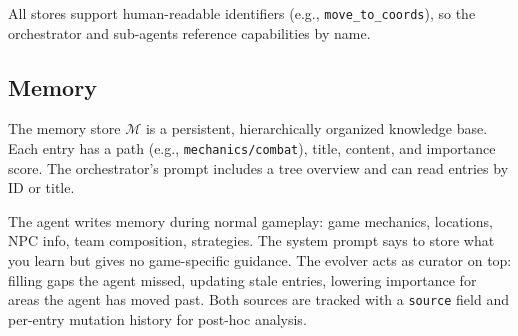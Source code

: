 All stores support human-readable identifiers (e.g., \texttt{move\_to\_coords}), so the orchestrator and sub-agents reference capabilities by name.

\subsection{Memory}\label{sec:memory}

The memory store $\mathcal{M}$ is a persistent, hierarchically organized knowledge base. Each entry has a path (e.g., \texttt{mechanics/combat}), title, content, and importance score. The orchestrator's prompt includes a tree overview and can read entries by ID or title.

The agent writes memory during normal gameplay: game mechanics, locations, NPC info, team composition, strategies. The system prompt says to store what you learn but gives no game-specific guidance. The evolver acts as curator on top: filling gaps the agent missed, updating stale entries, lowering importance for areas the agent has moved past. Both sources are tracked with a \texttt{source} field and per-entry mutation history for post-hoc analysis.
